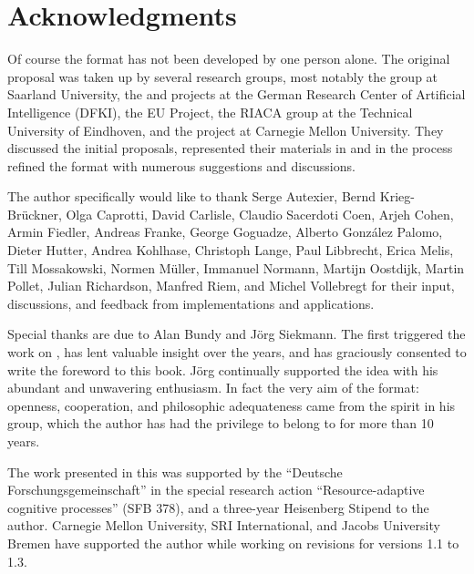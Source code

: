 
\chapter*{Acknowledgments}
 \thispagestyle{empty}
Of course the {\omdoc} format has not been developed by one person
alone. The original proposal was taken up by several research
groups, most notably the {\OMEGA} group at Saarland University, the
{\maya} and {\activemath} projects at the German Research Center of
Artificial Intelligence (DFKI), the {} EU Project, the
RIACA group at the Technical University of Eindhoven, and the
{} project at Carnegie Mellon University.  They
discussed the initial proposals, represented their materials in
{\omdoc} and in the process refined the format with numerous
suggestions and discussions.

The author specifically would like to thank Serge Autexier, Bernd Krieg-Br\"uckner, Olga
Caprotti, David Carlisle, Claudio Sacerdoti Coen, Arjeh Cohen, Armin Fiedler, Andreas
Franke, George Goguadze, Alberto Gonz\'alez Palomo, Dieter Hutter, Andrea Kohlhase,
Christoph Lange, Paul Libbrecht, Erica Melis, Till Mossakowski, Normen M\"uller, Immanuel
Normann, Martijn Oostdijk, Martin Pollet, Julian Richardson, Manfred Riem, and Michel
Vollebregt for their input, discussions, and feedback from implementations and
applications.

Special thanks are due to Alan Bundy and J\"org Siekmann. The first
triggered the work on {\omdoc}, has lent valuable insight over the
years, and has graciously consented to write the foreword to this
book. J\"org continually supported the {\omdoc} idea with his
abundant and unwavering enthusiasm. In fact the very aim of the
{\omdoc} format: openness, cooperation, and philosophic adequateness
came from the spirit in his {\OMEGA} group, which the author has had
the privilege to belong to for more than 10 years.

The work presented in this {\report} was supported by the ``Deutsche
For\-schungs\-gemeinschaft'' in the special research action ``Resource-adaptive cognitive
processes'' (SFB 378), and a three-year Heisenberg Stipend to the author.  Carnegie Mellon
University, SRI International, and Jacobs University Bremen have supported the author
while working on revisions for versions 1.1 to 1.3.


